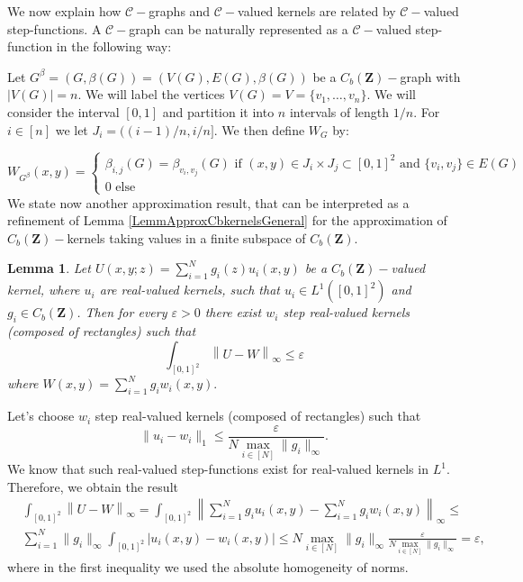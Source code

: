 \documentclass[11pt]{article}
\newtheorem{lemma}[theorem]{Lemma}
\newcommand{\cC}{{\mathcal C}}  %
\newcommand{\Space}{\mathbf{Z}}
\newcommand{\CbFunct}{C_b(\Space)}
\begin{document}
 We now explain how $\cC-$graphs and $\cC-$valued kernels are related by  $\cC-$valued step-functions.
A $\cC-$graph can be naturally represented as a $\cC-$valued step-function in the following way:

Let $G^{\beta}=(G,\beta(G))=(V(G),E(G),\beta(G))$ be a $\CbFunct-$graph with $|V(G)|=n.$
We will label the vertices $V(G)=V=\{v_1,\ldots,v_n\}.$ 
We will consider the interval $[0,1]$ and partition it into $n$ intervals of length $1/n$. For $i\in [n]$ we let $J_i=((i-1)/n,i/n].$ We then define $W_G$ by:


\begin{equation}\label{eq:DefWG}
    W_{G^{\beta}}(x,y)=\begin{cases}
 \beta_{i,j}(G)=\beta_{v_i,v_j}(G)\text{ if }(x,y)\in J_i\times J_j\subset [0,1]^2 \text{ and } \{v_i,v_j\}\in E(G)
 \\ 

0 \text{ else }
   
\end{cases}
\end{equation}
We state now another approximation result, that can be interpreted as a refinement of Lemma \ref{LemmApproxCbkernelsGeneral} for the approximation of $\CbFunct-$kernels taking values in a finite subspace of $\CbFunct.$ 

\begin{lemma}\label{lemmaApproxDecGraphonsRealValGraphons}
Let $U(x,y;z)=\sum^N_{i=1}g_i(z) u_i(x,y)$ be a $\CbFunct-$valued kernel, where $u_i$ are real-valued kernels, such that $u_i\in L^1([0,1]^2)$ and $g_i\in \CbFunct$. Then for every $\varepsilon>0$ there exist $w_i$ step real-valued kernels (composed of rectangles) such that  
$$
   \int_{[0,1]^2}\left\|U- W\right\|_{\infty}\leq \varepsilon $$
where $W(x,y)=\sum^N_{i=1}g_i w_i(x,y).$
\end{lemma}
\proof
Let's choose $w_i$ step real-valued kernels (composed of rectangles) such that  
$$
\|u_i-w_i\|_{1} \leq \frac{\varepsilon}{N\max_{i\in [N]}\|g_i\|_{\infty}}.
$$
 We know that such real-valued step-functions exist for real-valued kernels in $L^1$. Therefore, we obtain the result
$$
\begin{aligned}
  & \int_{[0,1]^2}\left\|U- W\right\|_{\infty}=\int_{[0,1]^2}\left\|\sum^N_{i=1}g_i u_i(x,y)- \sum^N_{i=1}g_i w_i(x,y)\right\|_{\infty} \leq  \\
  &\sum^N_{i=1}\|g_i\|_{\infty}\int_{[0,1]^2}|u_i(x,y)-w_i(x,y)|\leq N \max_{i\in [N]}\|g_i\|_{\infty}\frac{\varepsilon}{N\max_{i\in [N]}\|g_i\|_{\infty}}=\varepsilon,
   \end{aligned}$$
where in the first inequality we used the absolute homogeneity of norms.
\endproof
\end{document}
